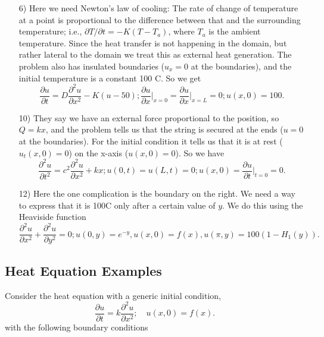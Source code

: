 \documentclass[reqno]{amsart}
\theoremstyle{definition}
\begin{document}
\begin{itemize}

\item[6)]  Here we need Newton's law of cooling:  The rate of change of temperature at a
point is proportional to the difference between that and the surrounding temperature; i.e.,
$\partial T/\partial t = -K(T-T_a)$, where $T_a$ is the ambient temperature.  Since the
heat transfer is not happening in the domain, but rather lateral to the domain we treat
this as external heat generation.  The problem also has insulated boundaries ($u_x = 0$
at the boundaries), and the initial temperature is a constant 100 C.  So we get
%
\begin{equation*}
\frac{\partial u}{\partial t} = D\frac{\partial^2 u}{\partial x^2} - K(u - 50);
\frac{\partial u}{\partial x}\bigg|_{x = 0} = \frac{\partial u}{\partial x}\bigg|_{x = L} = 0;
u(x,0) = 100.
\end{equation*}

\item[10)]  They say we have an external force proportional to the position, so $Q = kx$,
and the problem tells us that the string is secured at the ends ($u = 0$ at the boundaries).
For the initial condition it tells us that it is at rest ($u_t(x,0) = 0$) on the x-axis
($u(x,0) = 0$).  So we have
%
\begin{equation*}
\frac{\partial^2 u}{\partial t^2} = c^2\frac{\partial^2 u}{\partial x^2} + kx;
u(0,t) = u(L,t) = 0; u(x,0) = \frac{\partial u}{\partial t}\bigg|_{t = 0} = 0.
\end{equation*}

\item[12)]  Here the one complication is the boundary on the right.  We need a
way to express that it is 100C only after a certain value of $y$.  We do this
using the Heaviside function
%
\begin{equation*}
\frac{\partial^2 u}{\partial x^2} + \frac{\partial^2 u}{\partial y^2} = 0;
u(0,y) = e^{-y}, u(x,0) = f(x), u(\pi,y) = 100\left(1 - H_1(y)\right).
\end{equation*}

\end{itemize}

\subsection*{Heat Equation Examples}

Consider the heat equation with a generic initial condition,
%
\begin{equation}
\frac{\partial u}{\partial t} = k\frac{\partial^2 u}{\partial x^2};\quad
u(x,0) = f(x).
\end{equation}
%
with the following boundary conditions
\end{document}
